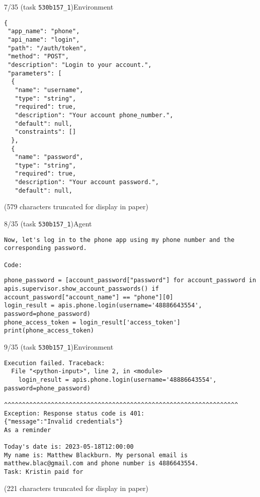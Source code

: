 \hspace*{8mm}%
\begin{minipage}{0.95\linewidth}
\begin{user_message_box}{{7/35 (task \texttt{530b157\_1})\hfill Environment}}
\scriptsize
\begin{Verbatim}[breaklines]
{
 "app_name": "phone",
 "api_name": "login",
 "path": "/auth/token",
 "method": "POST",
 "description": "Login to your account.",
 "parameters": [
  {
   "name": "username",
   "type": "string",
   "required": true,
   "description": "Your account phone_number.",
   "default": null,
   "constraints": []
  },
  {
   "name": "password",
   "type": "string",
   "required": true,
   "description": "Your account password.",
   "default": null,
\end{Verbatim}
(579 characters truncated for display in paper)\end{user_message_box}
\end{minipage}

\begin{minipage}{0.95\linewidth}
\begin{assistant_message_box}{{8/35 (task \texttt{530b157\_1})\hfill Agent}}
\scriptsize
\begin{Verbatim}[breaklines]
Now, let's log in to the phone app using my phone number and the corresponding password.

Code:
\end{Verbatim}
\begin{tcolorbox}[colback=codebgcolor,boxrule=0pt]\begin{Verbatim}[breaklines]
phone_password = [account_password["password"] for account_password in apis.supervisor.show_account_passwords() if account_password["account_name"] == "phone"][0]
login_result = apis.phone.login(username='48886643554', password=phone_password)
phone_access_token = login_result['access_token']
print(phone_access_token)
\end{Verbatim}
\end{tcolorbox}\end{assistant_message_box}
\end{minipage}

\hspace*{8mm}%
\begin{minipage}{0.95\linewidth}
\begin{user_message_box}{{9/35 (task \texttt{530b157\_1})\hfill Environment}}
\scriptsize
\begin{Verbatim}[breaklines]
Execution failed. Traceback:
  File "<python-input>", line 2, in <module>
    login_result = apis.phone.login(username='48886643554', password=phone_password)
                   ^^^^^^^^^^^^^^^^^^^^^^^^^^^^^^^^^^^^^^^^^^^^^^^^^^^^^^^^^^^^^^^^^
Exception: Response status code is 401:
{"message":"Invalid credentials"}
As a reminder

Today's date is: 2023-05-18T12:00:00
My name is: Matthew Blackburn. My personal email is matthew.blac@gmail.com and phone number is 4886643554.
Task: Kristin paid for 
\end{Verbatim}
(221 characters truncated for display in paper)\end{user_message_box}
\end{minipage}

